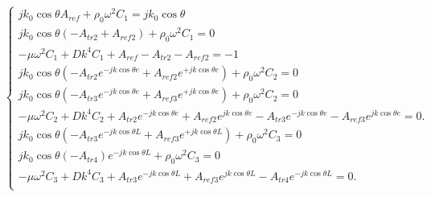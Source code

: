 \documentclass[12pt,foolscap]{report}
\begin{document}
	\begin{align}
	\begin{cases}
	j k_0 \cos\theta A_{ref}  +\rho_0\omega^2 C_{1}=j k_0 \cos\theta \\
	j k_0 \cos\theta (-A_{tr2}+A_{ref2})  +\rho_0\omega^2 C_{1}=0\\
	-\mu \omega^2C_{1}+Dk^4C_{1} +A_{ref} -A_{tr2}-A_{ref2} = -1\\
	j k_0 \cos\theta (-A_{tr2}e^{-jk\cos\theta e}+A_{ref2}e^{+jk\cos\theta e}) +\rho_0\omega^2 C_{2} =0\\
	j k_0 \cos\theta (-A_{tr3} e^{-jk\cos\theta e} +A_{ref3}e^{+jk\cos\theta e})+\rho_0\omega^2 C_{2}=0\\
	-\mu \omega^2C_{2}+Dk^4C_{2} +A_{tr2}e^{-jk\cos\theta e}+A_{ref2}e^{jk\cos\theta e}-A_{tr3}e^{-jk\cos\theta e}-A_{ref3}e^{jk\cos\theta e}=0 \text{.}\\
	j k_0 \cos\theta (-A_{tr3}e^{-jk\cos\theta L}+A_{ref3}e^{+jk\cos\theta L}) +\rho_0\omega^2 C_{3} =0\\
	j k_0 \cos\theta (-A_{tr4}) e^{-jk\cos\theta L} +\rho_0\omega^2 C_{3}=0\\
	-\mu \omega^2C_{3}+Dk^4C_{3} +A_{tr3}e^{-jk\cos\theta L}+A_{ref3}e^{jk\cos\theta L}-A_{tr4}e^{-jk\cos\theta L}=0 \text{.}\\
	\end{cases}
	\end{align}
	
\end{document}
